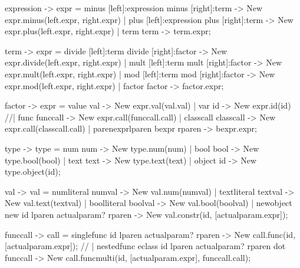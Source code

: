     expression  {-> expr}   =   {minus} [left]:expression minus [right]:term            {-> New expr.minus(left.expr, right.expr)}
                            |   {plus} [left]:expression plus [right]:term              {-> New expr.plus(left.expr, right.expr)}
                            |   {term} term                                             {-> term.expr};

    term        {-> expr}   =   {divide} [left]:term divide [right]:factor              {-> New expr.divide(left.expr, right.expr)}
                            |   {mult} [left]:term mult [right]:factor                  {-> New expr.mult(left.expr, right.expr)}
                            |   {mod} [left]:term mod [right]:factor                    {-> New expr.mod(left.expr, right.expr)}
                            |   {factor} factor                                         {-> factor.expr};

    factor      {-> expr}   =   {value} val                                             {-> New expr.val(val.val)}
                            |   {var} id                                                {-> New expr.id(id)}
                            //|   {func} funccall                                         {-> New expr.call(funccall.call)}
                            |   {classcall} classcall                                   {-> New expr.call(classcall.call)}
                            |   {parenexpr}lparen bexpr rparen                          {-> bexpr.expr};

    type        {-> type}   =   {num} num                                               {-> New type.num(num)}
                            |   {bool} bool                                             {-> New type.bool(bool)}
                            |   {text} text                                             {-> New type.text(text)}
                            |   {object} id                                             {-> New type.object(id)};

    val         {-> val}    =   {numliteral} numval                                     {-> New val.num(numval)}
                            |   {textliteral} textval                                   {-> New val.text(textval)}
                            |   {boolliteral} boolval                                   {-> New val.bool(boolval)}
                            |   {newobject} new id lparen actualparam? rparen           {-> New val.constr(id, [actualparam.expr])};

    funccall    {-> call}   =   {singlefunc} id lparen actualparam? rparen              {-> New call.func(id, [actualparam.expr])};
                    //        |   {nestedfunc} eclass id lparen actualparam? rparen dot funccall {-> New call.funcmulti(id, [actualparam.expr], funccall.call)};

